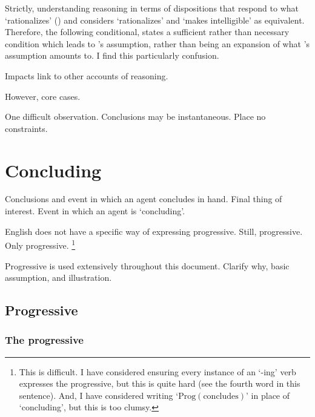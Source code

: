 \begin{note}
{  Strictly, \citeauthor{Wedgwood:2006ui} understanding reasoning in terms of dispositions that respond to what `rationalizes' (\citeyear[672]{Wedgwood:2006ui}) and \citeauthor{Wedgwood:2006ui} considers `rationalizes' and  `makes intelligible' as equivalent.
    Therefore, the following conditional, states a sufficient rather than necessary condition which leads to \citeauthor{Wedgwood:2006ui}'s assumption, rather than being an expansion of what \citeauthor{Wedgwood:2006ui}'s assumption amounts to.
    I find this particularly confusion.
  }

  Impacts link to other accounts of reasoning.

  However, core cases.
\end{note}

\begin{note}
  One difficult observation.
  Conclusions may be instantaneous.
  Place no constraints.
\end{note}

\section{Concluding}
\label{cha:clar:sec:Cing}

\begin{note}
  Conclusions and event in which an agent concludes in hand.
  Final thing of interest.
  Event in which an agent is `concluding'.

  English does not have a specific way of expressing progressive.
  Still, progressive.
  Only progressive.%
  \footnote{
    This is difficult.
    I have considered ensuring every instance of an `-ing' verb expresses the progressive, but this is quite hard (see the fourth word in this sentence).
    And, I have considered writing `\(\text{Prog}(\text{concludes})\)' in place of `concluding', but this is too clumsy.
  }

  Progressive is used extensively throughout this document.
  Clarify why, basic assumption, and illustration.
\end{note}

\subsection{Progressive}

\subsubsection{The progressive}

